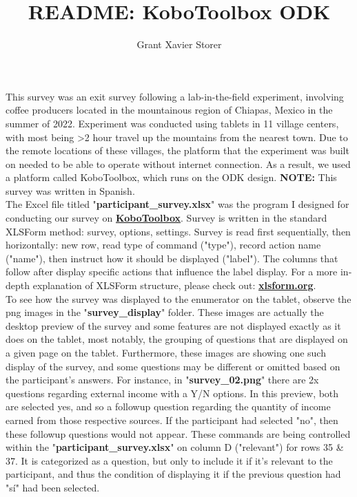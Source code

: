 \documentclass{article}
\title{README: KoboToolbox ODK}
\author{Grant Xavier Storer}
\date{}
\begin{document}
\maketitle

\noindent This survey was an exit survey following a lab-in-the-field experiment, involving coffee producers located in the mountainous region of Chiapas, Mexico in the summer of 2022. Experiment was conducted using tablets in 11 village centers, with most being \textgreater 2 hour travel up the mountains from the nearest town. Due to the remote locations of these villages, the platform that the experiment was built on needed to be able to operate without internet connection. As a result, we used a platform called KoboToolbox, which runs on the ODK design. \textbf{NOTE:} This survey was written in Spanish.\\

\noindent The Excel file titled "\textbf{participant\_survey.xlsx}" was the program I designed for conducting our survey on \href{https://support.kobotoolbox.org/welcome.html}{\textbf{KoboToolbox}}. Survey is written in the standard XLSForm method: survey, options, settings. Survey is read first sequentially, then horizontally: new row, read type of command ("type"), record action name ("name"), then instruct how it should be displayed ("label"). The columns that follow after display specific actions that influence the label display. For a more in-depth explanation of XLSForm structure, please check out: \href{https://xlsform.org/en/}{\textbf{xlsform.org}}.\\

\noindent To see how the survey was displayed to the enumerator on the tablet, observe the png images in the "\textbf{survey\_display}" folder. These images are actually the desktop preview of the survey and some features are not displayed exactly as it does on the tablet, most notably, the grouping of questions that are displayed on a given page on the tablet. Furthermore, these images are showing one such display of the survey, and some questions may be different or omitted based on the participant's answers. For instance, in "\textbf{survey\_02.png}" there are 2x questions regarding external income with a Y/N options. In this preview, both are selected yes, and so a followup question regarding the quantity of income earned from those respective sources. If the participant had selected "no", then these followup questions would not appear. These commands are being controlled within the "\textbf{participant\_survey.xlsx}" on column D ("relevant") for rows 35 \& 37. It is categorized as a question, but only to include it if it's relevant to the participant, and thus the condition of displaying it if the previous question had "sí" had been selected.  
\end{document}
